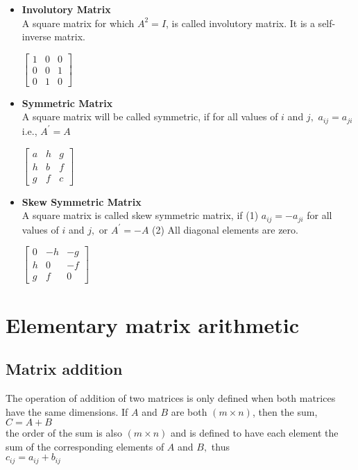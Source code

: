 \begin{itemize}
\begin{example}
	\end{example}
	 \item  \textbf{Involutory Matrix}\\ A square matrix for which $A^{2}=I$, is called involutory matrix. It is a self-inverse matrix.
	 \begin{example}
	 	$\left[\begin{array}{lll}1 & 0 & 0 \\ 0 & 0 & 1 \\ 0 & 1 & 0\end{array}\right]$
	 \end{example}
	 \item \textbf{Symmetric Matrix}\\
	 A square matrix will be called symmetric, if for all values of $i$ and $j,$ $a_{i j}=a_{j i}$ i.e., $A^{\prime}=A$
	\begin{example}
		 $
	 \left[\begin{array}{lll}
	 	a & h & g \\
	 	h & b & f \\
	 	g & f & c
	 \end{array}\right]
	 $
	\end{example}
	 \item \textbf{Skew Symmetric Matrix}\\A square matrix is called skew symmetric matrix, if
	 (1) $a_{i j}=-a_{j i}$ for all values of $i$ and $j,$ or $A^{\prime}=-A$
	 (2) All diagonal elements are zero.
	\begin{example}
		 $
	 \left[\begin{array}{ccc}
	 	0 & -h & -g \\
	 	h & 0 & -f \\
	 	g & f & 0
	 \end{array}\right]
	 $
	\end{example}
	 \end{itemize}
	 \section{Elementary matrix arithmetic}
	 \subsection{Matrix addition}
	 The operation of addition of two matrices is only defined when both matrices have the same dimensions. If ${A}$ and ${B}$ are both $(m \times n)$, then the sum,
	 \\$
	 {C}={A}+{B}
	 $\\
	 the order of the sum is also $(m \times n)$ and is defined to have each element the sum of the corresponding elements of ${A}$ and ${B},$ thus
	 \\$
	 c_{i j}=a_{i j}+b_{i j}
	 $
